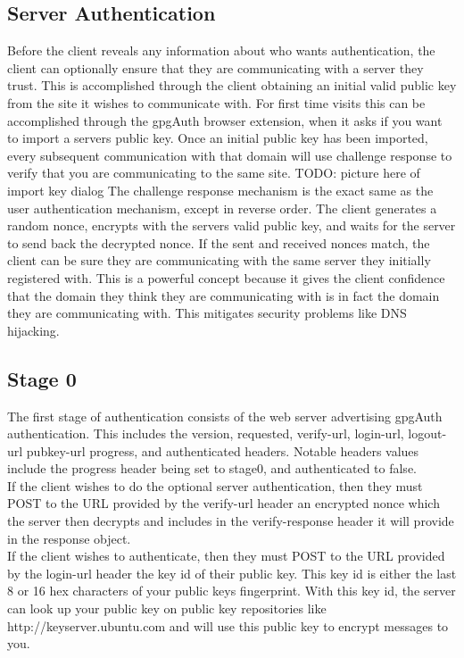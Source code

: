 \documentclass[11pt]{article}
\begin{document}
\subsection{Server Authentication} \label{subsec:serverAuth}
Before the client reveals any information about who wants authentication, the client can optionally ensure that they are communicating with a server they trust. This is accomplished through the client obtaining an initial valid public key from the site it wishes to communicate with. For first time visits this can be accomplished through the gpgAuth browser extension, when it asks if you want to import a servers public key. Once an initial public key has been imported, every subsequent communication with that domain will use challenge response to verify that you are communicating to the same site.
TODO: picture here of import key dialog
The challenge response mechanism is the exact same as the user authentication mechanism, except in reverse order. The client generates a random nonce, encrypts with the servers valid public key, and waits for the server to send back the decrypted nonce. If the sent and received nonces match, the client can be sure they are communicating with the same server they initially registered with.
This is a powerful concept because it gives the client confidence that the domain they think they are communicating with is in fact the domain they are communicating with. This mitigates security problems like DNS hijacking.

\subsection{Stage 0} \label{subsec:stage0}
The first stage of authentication consists of the web server advertising gpgAuth authentication. This includes the version, requested, verify-url, login-url, logout-url pubkey-url progress, and authenticated headers. Notable headers values include the progress header being set to stage0, and authenticated to false. \\
If the client wishes to do the optional server authentication, then they must POST to the URL provided by the verify-url header an encrypted nonce which the server then decrypts and includes in the verify-response header it will provide in the response object. \\
If the client wishes to authenticate, then they must POST to the URL provided by the login-url header the key id of their public key. This key id is either the last 8 or 16 hex characters of your public keys fingerprint. With this key id, the server can look up your public key on public key repositories like http://keyserver.ubuntu.com and will use this public key to encrypt messages to you. \\
\end{document}
